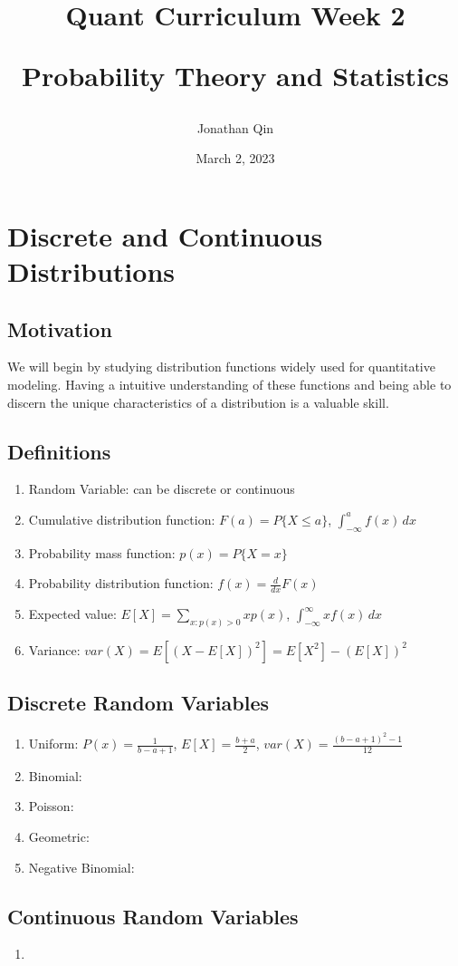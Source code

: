 \documentclass{article}
\title{

\begin{center} \textbf{Quant Curriculum Week 2}

Probability Theory and Statistics \end{center}
}
\author{Jonathan Qin}
\date{March 2, 2023}
\begin{document}
\maketitle

\section{Discrete and Continuous Distributions}

\subsection{Motivation}
We will begin by studying distribution functions widely used for quantitative modeling. Having a intuitive understanding of these functions and being able to discern the unique characteristics of a distribution is a valuable skill. 

\subsection{Definitions}
\begin{enumerate}
    \item Random Variable: can be discrete or continuous
    \item Cumulative distribution function: \(F(a) = P\{X \leq a\}\), \(\int_{-\infty}^{a} f(x) \,dx\)
    \item Probability mass function: \(p(x) = P\{X=x\}\) 
    \item Probability distribution function: \(f(x) = \frac{d}{dx}F(x)\)
    \item Expected value: \(E[X] = \sum_{x:p(x)>0} xp(x)\), \(\int_{-\infty}^{\infty} xf(x) \,dx\)
    \item Variance: \(var(X) = E[(X-E[X])^2] = E[X^2] - (E[X])^2\)
\end{enumerate}

\subsection{Discrete Random Variables}
\begin{enumerate}
    \item Uniform: \(P(x) = \frac{1}{b-a+1}\), \(E[X] = \frac{b+a}{2}\), \(var(X) = \frac{(b-a+1)^2 -1}{12}\)
    \item Binomial: 
    \item Poisson:
    \item Geometric:
    \item Negative Binomial:
\end{enumerate}

\subsection{Continuous Random Variables}
\begin{enumerate}
    \item 
\end{enumerate}
\end{document}

